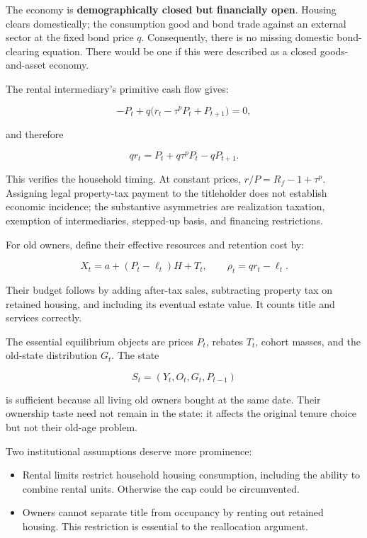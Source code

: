 \documentclass[11pt,letterpaper]{article}
\providecommand{\tightlist}{\setlength{\itemsep}{0.25em}\setlength{\parskip}{0pt}}
\begin{document}
\endgroup

The economy is \textbf{demographically closed but financially open}. Housing clears
domestically; the consumption good and bond trade against an external sector at the fixed
bond price \(q\). Consequently, there is no missing domestic bond-clearing equation. There
would be one if this were described as a closed goods-and-asset economy.

The rental intermediary's primitive cash flow gives:

\[
-P_t+q\bigl(r_t-\tau^pP_t+P_{t+1}\bigr)=0,
\]

and therefore

\[
qr_t=P_t+q\tau^pP_t-qP_{t+1}.
\]

This verifies the household timing. At constant prices, \(r/P=R_f-1+\tau^p\). Assigning
legal property-tax payment to the titleholder does not establish economic incidence; the
substantive asymmetries are realization taxation, exemption of intermediaries, stepped-up
basis, and financing restrictions.

For old owners, define their effective resources and retention cost by:

\[
X_t=a+(P_t-\ell_t)H+T_t,
\qquad
\rho_t=qr_t-\ell_t.
\]

Their budget follows by adding after-tax sales, subtracting property tax on retained
housing, and including its eventual estate value. It counts title and services correctly.

The essential equilibrium objects are prices \(P_t\), rebates \(T_t\), cohort masses, and
the old-state distribution \(G_t\). The state

\[
S_t=(Y_t,O_t,G_t,P_{t-1})
\]

is sufficient because all living old owners bought at the same date. Their ownership taste
need not remain in the state: it affects the original tenure choice but not their old-age
problem.

Two institutional assumptions deserve more prominence:

\begin{itemize}
\tightlist
\item
  Rental limits restrict household housing consumption, including the ability to combine
  rental units. Otherwise the cap could be circumvented.
\item
  Owners cannot separate title from occupancy by renting out retained housing. This
  restriction is essential to the reallocation argument.
\end{itemize}
\end{document}
